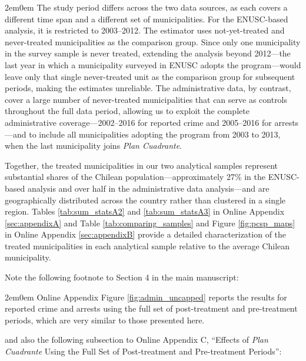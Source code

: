 \begin{adjustwidth}{2em}{0em}
The study period differs across the two data sources, as each covers a different time span and a different set of municipalities. For the ENUSC-based analysis, it is restricted to 2003--2012. The \citet{Callaway} estimator uses not-yet-treated and never-treated municipalities as the comparison group. Since only one municipality in the survey sample is never treated, extending the analysis beyond 2012---the last year in which a municipality surveyed in ENUSC adopts the program---would leave only that single never-treated unit as the comparison group for subsequent periods, making the estimates unreliable. The administrative data, by contrast, cover a large number of never-treated municipalities that can serve as controls throughout the full data period, allowing us to exploit the complete administrative coverage---2002--2016 for reported crime and 2005--2016 for arrests---and to include all municipalities adopting the program from 2003 to 2013, when the last municipality joins \emph{Plan Cuadrante}.

Together, the treated municipalities in our two analytical samples represent substantial shares of the Chilean population---approximately 27\% in the ENUSC-based analysis and over half in the administrative data analysis---and are geographically distributed across the country rather than clustered in a single region. Tables \ref{tab:sum_statsA2} and \ref{tab:sum_statsA3} in Online Appendix \ref{sec:appendixA} and Table \ref{tab:comparing_samples} and Figure \ref{fig:pcsp_maps} in Online Appendix \ref{sec:appendixB} provide a detailed characterization of the treated municipalities in each analytical sample relative to the average Chilean municipality.
\end{adjustwidth}

Note the following footnote to Section 4 in the main manuscript:

\begin{adjustwidth}{2em}{0em}
Online Appendix Figure \ref{fig:admin_uncapped} reports the results for reported crime and arrests using the full set of post-treatment and pre-treatment periods, which are very similar to those presented here.
\end{adjustwidth}

and also the following subsection to Online Appendix C, ``Effects of \emph{Plan Cuadrante} Using the Full Set of Post-treatment and Pre-treatment Periods'':

